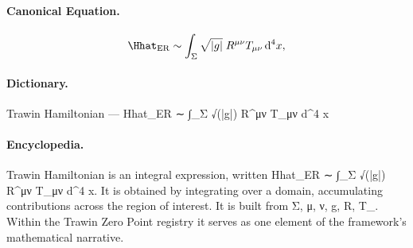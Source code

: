 \paragraph{Canonical Equation.}
\[
\Hhat_{\text{ER}} \sim \int_\Sigma \sqrt{|g|}\; R^{\mu\nu} T_{\mu\nu}\,\mathrm{d}^4 x,
\]

\paragraph{Dictionary.}
Trawin Hamiltonian — Hhat\_ER ∼ ∫\_Σ √(|g|) R\textasciicircum{}μν T\_μν d\textasciicircum{}4 x

\paragraph{Encyclopedia.}
Trawin Hamiltonian is an integral expression, written Hhat\_ER ∼ ∫\_Σ √(|g|) R\textasciicircum{}μν T\_μν d\textasciicircum{}4 x. It is obtained by integrating over a domain, accumulating contributions across the region of interest. It is built from Σ, μ, ν, g, R, T\_. Within the Trawin Zero Point registry it serves as one element of the framework's mathematical narrative.
